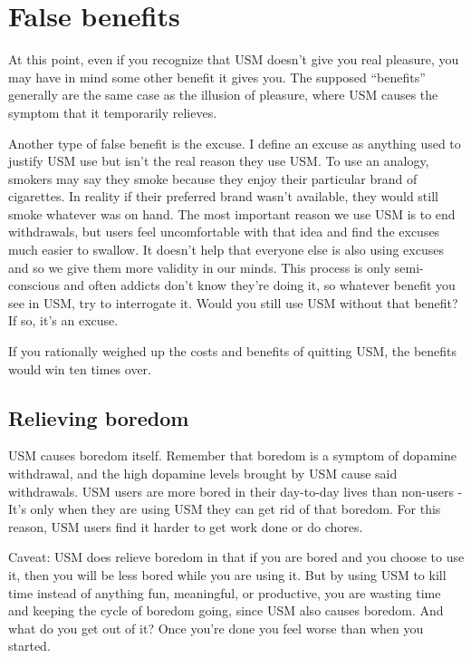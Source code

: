 \documentclass[
  openany]{book}
\newenvironment{rmdnote}{
\color{blue}
\begin{framed}}{\end{framed}}
\begin{document}
\chapter{False benefits}\label{benefits}

At this point, even if you recognize that USM doesn't give you real pleasure, you may have in mind some other benefit it gives you. The supposed ``benefits'' generally are the same case as the illusion of pleasure, where USM causes the symptom that it temporarily relieves.

Another type of false benefit is the excuse. I define an excuse as anything used to justify USM use but isn't the real reason they use USM. To use an analogy, smokers may say they smoke because they enjoy their particular brand of cigarettes. In reality if their preferred brand wasn't available, they would still smoke whatever was on hand. The most important reason we use USM is to end withdrawals, but users feel uncomfortable with that idea and find the excuses much easier to swallow. It doesn't help that everyone else is also using excuses and so we give them more validity in our minds. This process is only semi-conscious and often addicts don't know they're doing it, so whatever benefit you see in USM, try to interrogate it. Would you still use USM without that benefit? If so, it's an excuse.

\begin{rmdnote}
If you rationally weighed up the costs and benefits of quitting USM, the benefits would win ten times over.

\end{rmdnote}

\section{Relieving boredom}\label{relieving-boredom}

USM causes boredom itself. Remember that boredom is a symptom of dopamine withdrawal, and the high dopamine levels brought by USM cause said withdrawals. USM users are more bored in their day-to-day lives than non-users - It's only when they are using USM they can get rid of that boredom. For this reason, USM users find it harder to get work done or do chores.

Caveat: USM does relieve boredom in that if you are bored and you choose to use it, then you will be less bored while you are using it. But by using USM to kill time instead of anything fun, meaningful, or productive, you are wasting time and keeping the cycle of boredom going, since USM also causes boredom. And what do you get out of it? Once you're done you feel worse than when you started.
\end{document}
